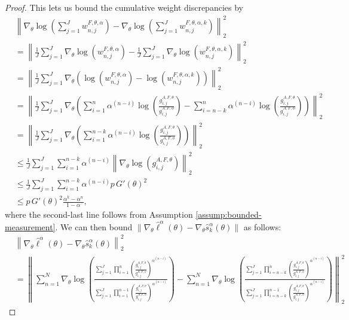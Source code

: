 \begin{proof}
This lets us bound the cumulative weight discrepancies by
\begin{align}
    &  \left\lVert\nabla_\theta\log\left(\sum_{j=1}^J w_{n,j}^{F,\theta,\alpha}\right)-\nabla_\theta\log\left(\sum_{j=1}^J w_{n,j}^{F,\theta,\alpha,k}\right)\right\rVert_2^2\\
    &= \left\lVert\frac{1}{J}\sum_{j=1}^J \nabla_\theta \log\left(w_{n,j}^{F,\theta,\alpha}\right)-\frac{1}{J}\sum_{j=1}^J \nabla_\theta \log\left(w_{n,j}^{F,\theta,\alpha,k}\right)\right\rVert_2^2 \\
    &= \left\lVert\frac{1}{J}\sum_{j=1}^J \nabla_\theta \left(\log\left(w_{n,j}^{F,\theta,\alpha}\right)-\log\left(w_{n,j}^{F,\theta,\alpha,k}\right)\right)\right\rVert_2^2\\
    &= \left\lVert\frac{1}{J}\sum_{j=1}^J \nabla_\theta \left(\sum_{i=1}^n\alpha^{(n-i)}\log\left(\frac{g_{i,j}^{A,F,\theta}}{g_{i,j}^{A,F,\phi}} \right) - \sum_{i=n-k}^n{\alpha^{(n-i)}}\log\left(\frac{g_{i,j}^{A,F,\theta}}{g_{i,j}^{A,F,\phi}} \right)\right)\right\rVert_2^2 \\
    &= \left\lVert\frac{1}{J}\sum_{j=1}^J \nabla_\theta \left(\sum_{i=1}^{n-k}\alpha^{(n-i)}\log\left(\frac{g_{i,j}^{A,F,\theta}}{g_{i,j}^{A,F,\phi}} \right) \right)\right\rVert_2^2\\
    &\leq \frac{1}{J}\sum_{j=1}^J \sum_{i=1}^{n-k}\alpha^{(n-i)}\left\lVert\nabla_\theta\log\left(g_{i,j}^{A,F,\theta} \right)\right\rVert_2^2\\
    &\leq \frac{1}{J}\sum_{j=1}^J \sum_{i=1}^{n-k}\alpha^{(n-i)}p \, G'(\theta)^2\\
    &\leq p \, G'(\theta)^2\frac{\alpha^k-\alpha^n}{1-\alpha},
\end{align}
where the second-last line follows from Assumption \ref{assump:bounded-measurement}.
We can then bound $\|\nabla_\theta\hat\ell^\alpha(\theta) - \nabla_\theta \hat s_k^\alpha(\theta)\|$ as follows:
\begin{align}
    &\left\lVert\nabla_\theta\hat\ell^\alpha(\theta) - \nabla_\theta \hat s_k^\alpha(\theta) \right\rVert_2^2
    \\ \nonumber
    &= \left\lVert\sum_{n=1}^N \nabla_\theta \log\left(\frac{\sum_{j=1}^J\prod_{i=1}^n\left(\frac{g_{i,j}^{A,F,\theta}}{g_{i,j}^{A,F,\phi}} \right)^{\alpha^{(n-i)}}}{\sum_{j=1}^J\prod_{i=1}^{n-1}\left(\frac{g_{i,j}^{A,F,\theta}}{g_{i,j}^{A,F,\phi}} \right)^{\alpha^{(n-i)}}}\right) - \sum_{n=1}^N \nabla_\theta\log\left(\frac{\sum_{j=1}^J\prod_{i=n-k}^n\left(\frac{g_{i,j}^{A,F,\theta}}{g_{i,j}^{A,F,\phi}} \right)^{\alpha^{(n-i)}}}{\sum_{j=1}^J\prod_{i=n-k}^{n-1}\left(\frac{g_{i,j}^{A,F,\theta}}{g_{i,j}^{A,F,\phi}} \right)^{\alpha^{(n-i)}}}\right) \right\rVert_2^2

\end{align}
\end{proof}
